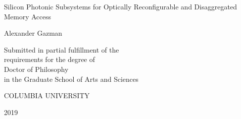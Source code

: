 
\thispagestyle{empty} %
\begin{center}
  \SingleSpace

  \vspace*{1in}

 Silicon Photonic Subsystems for Optically Reconfigurable and Disaggregated Memory Access

  \bigskip %

  Alexander Gazman

  \vspace{5in}

  Submitted in partial fulfillment of the\\
  requirements for the degree of\\
  Doctor of Philosophy\\
  in the Graduate School of Arts and Sciences

  \bigskip
  \bigskip

  COLUMBIA UNIVERSITY

  \bigskip %

  2019
\end{center}
